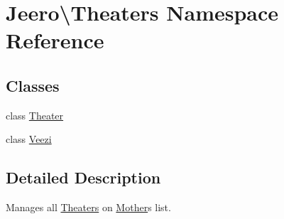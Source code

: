\hypertarget{namespaceJeero_1_1Theaters}{}\section{Jeero\textbackslash{}Theaters Namespace Reference}
\label{namespaceJeero_1_1Theaters}
\subsection*{Classes}
\begin{DoxyCompactItemize}
\item 
class \hyperlink{classJeero_1_1Theaters_1_1Theater}{Theater}
\item 
class \hyperlink{classJeero_1_1Theaters_1_1Veezi}{Veezi}
\end{DoxyCompactItemize}


\subsection{Detailed Description}
Manages all \hyperlink{namespaceJeero_1_1Theaters}{Theaters} on \hyperlink{namespaceJeero_1_1Mother}{Mother}\textquotesingle{}s list. 